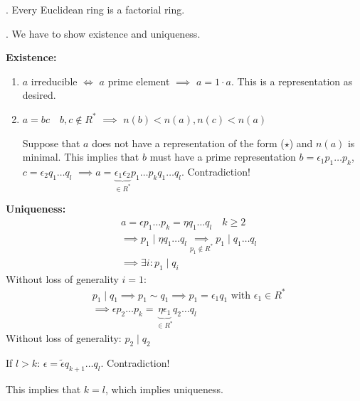 \Theorem.
Every Euclidean ring is a factorial ring.

\Proof.
We have to show existence and uniqueness.

\textbf{Existence:}
\begin{enumerate}[{Case} 1:]
  \item $a$ irreducible $\Leftrightarrow$ $a$ prime element $\implies$ $a=1\cdot a$. This is a representation as desired.

  \item $a= bc \quad b,c \not\in R^{*}$ $\implies$ $n(b) < n(a), n(c) < n(a)$

  Suppose that $a$ does not have a representation of the form ($\star$) and $n(a)$ is minimal.
  This implies that $b$ must have a prime representation $b = \epsilon_1 p_1 \ldots p_k$, $c = \epsilon_2 q_1 \ldots q_l$
  $\implies a = \underbrace{\epsilon_1 \epsilon_2}_{\in R^{*}} p_1 \ldots p_k q_1 \ldots q_l$. Contradiction!
\end{enumerate}

\textbf{Uniqueness:}
\begin{align*}
  & a = \epsilon p_1 \ldots p_k = \eta q_1 \ldots q_l \quad k\geq 2\\
  & \implies p_1 ∣ \eta q_1 \ldots q_l \underset{p_1 \not\in R^{*}}{\implies}{} p_1 ∣ q_1 \ldots q_l\\
  & \implies \exists i: p_1 ∣ q_i
\end{align*}
Without loss of generality $i = 1$:
\begin{align*}
  & p_1∣q_1 \implies p_1 \sim q_1 \implies p_1 = \epsilon_1 q_1 \text{ with } \epsilon_1 \in R^{*}\\
  & \implies\epsilon p_2 \ldots p_k = \underbrace{\eta \epsilon_1}_{\in R^{*}} q_2 \ldots q_l
\end{align*}
Without loss of generality: $p_2∣q_2$

If $l > k$: $\epsilon = \tilde{\epsilon} q_{k+1} \ldots q_l$. Contradiction!

This implies that $k=l$, which implies uniqueness.
